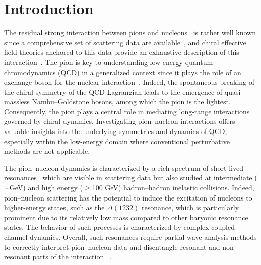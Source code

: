 \documentclass[ALICE,manyauthors]{cernphprep}
\begin{document}
\setcounter{page}{2} %


\section{Introduction}
\label{s:Introduction}

The residual strong interaction between pions and nucleons~\cite{WEINBERG19913,Moorhouse:1969va, Ericson:1988gk} is rather well known since a comprehensive set of scattering data are available~\cite{Arndt:1995bj,PDG}, and chiral effective field theories anchored to this data provide an exhaustive description of this interaction~\cite{Fettes:1998ud,GASPARYAN2010126}.
The pion is key to understanding low-energy quantum
chromodynamics (QCD) in a generalized context since it plays the role of an exchange boson for the nuclear interaction~\cite{Lee:2002eq}. Indeed, the spontaneous breaking of the chiral symmetry of the QCD Lagrangian leads to the emergence of quasi massless Nambu--Goldstone bosons, among which the pion is the lightest.
Consequently, the pion plays a central role in mediating long-range interactions governed by chiral dynamics. Investigating pion--nucleon interactions offers valuable insights into the underlying symmetries and dynamics of QCD, especially within the low-energy domain where conventional perturbative methods are not applicable.

The pion--nucleon dynamics is characterized by a rich spectrum of short-lived resonances~\cite{Meissner:1999vr, PDG} which are visible in scattering data but also studied at intermediate ($\sim$GeV) and high energy ($\geq $100 GeV) \mbox{hadron--hadron} inelastic collisions.
Indeed, pion--nucleon scattering has the potential to induce the excitation of nucleons to higher-energy states, such as the $\Delta(1232)$  resonance, which is particularly prominent due to its relatively low mass compared to other baryonic resonance states.  The behavior of such processes is characterized by complex coupled-channel dynamics. Overall, such resonances  require partial-wave analysis methods to correctly interpret pion--nucleon data and disentangle resonant and non-resonant parts of the interaction~\cite{Cutkosky:1979fy,Arndt:2006bf, Andronic:2018qqt} .
\end{document}
